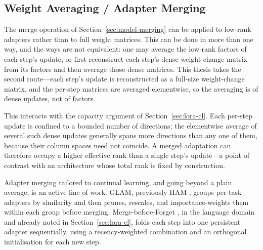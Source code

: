 \subsection{Weight Averaging / Adapter Merging}
\label{sec:adapter-merging}

The merge operation of Section~\ref{sec:model-merging} can be applied to low-rank adapters
rather than to full weight matrices. This can be done in more than one way,
and the ways are not equivalent: one may average the low-rank factors of
each step's update, or first reconstruct each step's dense weight-change
matrix from its factors and then average those dense matrices. This thesis
takes the second route---each step's update is reconstructed as a
full-size weight-change matrix, and the per-step matrices are averaged
elementwise, so the averaging is of dense updates, not of factors.

This interacts with the capacity argument of Section~\ref{sec:lora-cl}. Each per-step
update is confined to a bounded number of directions; the elementwise
average of several such dense updates generally spans more directions than
any one of them, because their column spaces need not coincide. A merged
adaptation can therefore occupy a higher effective rank than a single
step's update---a point of contrast with an architecture whose total rank
is fixed by construction.

Adapter merging tailored to continual learning, and going beyond a plain
average, is an active line of work. GLAM, previously HAM \parencite{testa2025glam},
groups per-task adapters by similarity and then prunes, rescales,
and importance-weights them within each group before merging.
Merge-before-Forget \parencite{qiao2025merge}, in the language domain and
already noted in Section~\ref{sec:lora-cl}, folds each step into one persistent adapter
sequentially, using a recency-weighted combination and an orthogonal
initialisation for each new step.

